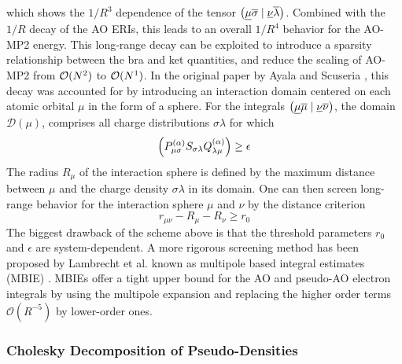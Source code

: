 \noindent which shows the $1/R^3$ dependence of the tensor $\left( \underline{\mu}\overline{\sigma} \mid \underline{\nu}\overline{\lambda} \right)$. Combined with the $1/R$ decay of the AO ERIs, this leads to an overall $1/R^4$ behavior for the AO-MP2 energy. This long-range decay can be exploited to introduce a sparsity relationship between the bra and ket quantities, and reduce the scaling of AO-MP2 from $\mathcal{O}(N^{2})$ to $\mathcal{O}(N^{1})$. In the original paper by Ayala and Scuseria \cite{Aya1999}, this decay was accounted for by introducing an interaction domain centered on each atomic orbital $\mu$ in the form of a sphere. For the integrals $\left( \underline{\mu}\overline{\mu} \mid \underline{\nu}\overline{\nu} \right)$, the domain $\mathcal{D}(\mu)$, comprises all charge distributions $\sigma\lambda$ for which 
\begin{equation}
\left( P^{(\alpha)}_{\mu\sigma} S_{\sigma\lambda} Q^{(\alpha)}_{\lambda\mu} \right) \geq \epsilon 
\end{equation}
\noindent The radius $R_{\mu}$ of the interaction sphere is defined by the maximum distance between $\mu$ and the charge density $\sigma\lambda$ in its domain. One can then screen long-range behavior for the interaction sphere $\mu$ and $\nu$ by the distance criterion
\begin{equation}
r_{\mu\nu} - R_{\mu} - R_{\nu} \geq r_0
\end{equation}
\noindent The biggest drawback of the scheme above is that the threshold parameters $r_0$ and $\epsilon$ are system-dependent. 
A more rigorous screening method has been proposed by Lambrecht et al. known as multipole based integral estimates (MBIE) \cite{Lam2005,Lam2005a,Dos2008}. MBIEs offer a tight upper bound for the AO and pseudo-AO electron integrals by using the multipole expansion and replacing the higher order terms $\mathcal{O}(R^{-5})$ by lower-order ones. 


\subsubsection{Cholesky Decomposition of Pseudo-Densities}

